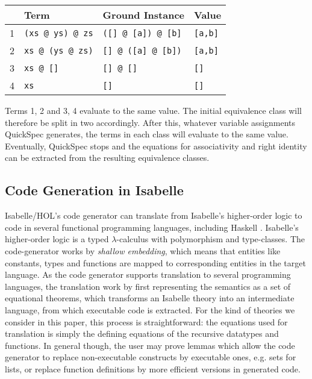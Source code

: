 \begin{tabularx}{\textwidth}{l  X  X  X}
\\
 & Term & Ground Instance & Value \\
 \hline
1 \quad &\texttt{(xs @ ys) @ zs} & \texttt{([] @ [a]) @ [b]} & \texttt{[a,b]} \\
2 \quad&\texttt{xs @ (ys @ zs)} &\texttt{[] @ ([a] @ [b])} & \texttt{[a,b]}\\
3 \quad&\texttt{xs @ []} & \texttt{[] @ []} & \texttt{[]} \\
4 \quad &\texttt{xs} &\texttt{[]} & \texttt{[]} \\
\end{tabularx}
Terms 1, 2  and 3, 4 evaluate to the same value. The initial equivalence class will therefore be split in two accordingly.
After this, whatever variable assignments QuickSpec generates, the
terms in each class will evaluate to the same value. Eventually, QuickSpec stops and the equations for
associativity and right identity can be extracted from the resulting equivalence classes.

\subsection{Code Generation in Isabelle}
Isabelle/HOL's code generator can translate from Isabelle's higher-order logic to code in several functional programming languages, including Haskell \cite{codegen2,codegen}. Isabelle's higher-order logic is a typed $\lambda$-calculus with polymorphism and type-classes. The code-generator works by \emph{shallow embedding}, which means that entities like constants, types and functions are mapped to corresponding entities in the target language. As the code generator supports translation to several programming languages, the translation work by first representing the semantics as a set of equational theorems, which transforms an Isabelle theory into an intermediate language, from which executable code is extracted. For the kind of theories we consider in this paper, this process is straightforward: the equations used for translation is simply the defining equations of the recursive datatypes and functions. In general though, the user may prove lemmas which allow the code generator to replace non-executable constructs by executable ones, e.g. sets for lists, or replace function definitions by more efficient versions in generated code. 

